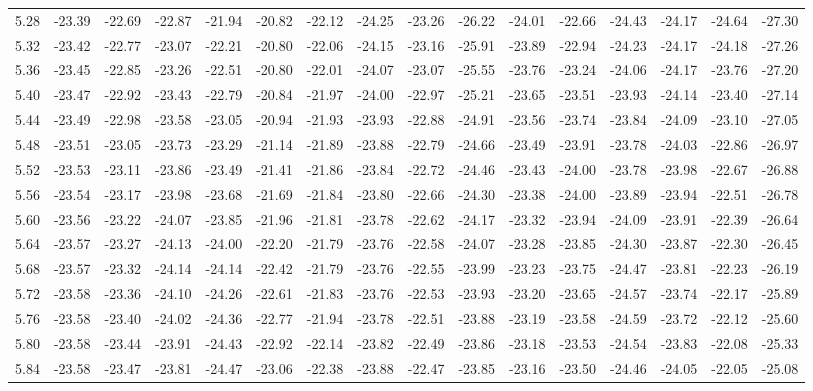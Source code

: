\documentclass[floatfix,traditabstract,preprint2]{aa}
\begin{document}
\begin{table}
\begin{tabular}{c  c c c c c c c c c c c c c c c}
5.28 & -23.39 & -22.69 & -22.87 & -21.94 & -20.82 & -22.12 & -24.25 & -23.26 & -26.22 & -24.01 & -22.66 & -24.43 & -24.17 & -24.64 & -27.30\\
5.32 & -23.42 & -22.77 & -23.07 & -22.21 & -20.80 & -22.06 & -24.15 & -23.16 & -25.91 & -23.89 & -22.94 & -24.23 & -24.17 & -24.18 & -27.26\\
5.36 & -23.45 & -22.85 & -23.26 & -22.51 & -20.80 & -22.01 & -24.07 & -23.07 & -25.55 & -23.76 & -23.24 & -24.06 & -24.17 & -23.76 & -27.20\\
5.40 & -23.47 & -22.92 & -23.43 & -22.79 & -20.84 & -21.97 & -24.00 & -22.97 & -25.21 & -23.65 & -23.51 & -23.93 & -24.14 & -23.40 & -27.14\\
5.44 & -23.49 & -22.98 & -23.58 & -23.05 & -20.94 & -21.93 & -23.93 & -22.88 & -24.91 & -23.56 & -23.74 & -23.84 & -24.09 & -23.10 & -27.05\\
5.48 & -23.51 & -23.05 & -23.73 & -23.29 & -21.14 & -21.89 & -23.88 & -22.79 & -24.66 & -23.49 & -23.91 & -23.78 & -24.03 & -22.86 & -26.97\\
5.52 & -23.53 & -23.11 & -23.86 & -23.49 & -21.41 & -21.86 & -23.84 & -22.72 & -24.46 & -23.43 & -24.00 & -23.78 & -23.98 & -22.67 & -26.88\\
5.56 & -23.54 & -23.17 & -23.98 & -23.68 & -21.69 & -21.84 & -23.80 & -22.66 & -24.30 & -23.38 & -24.00 & -23.89 & -23.94 & -22.51 & -26.78\\
5.60 & -23.56 & -23.22 & -24.07 & -23.85 & -21.96 & -21.81 & -23.78 & -22.62 & -24.17 & -23.32 & -23.94 & -24.09 & -23.91 & -22.39 & -26.64\\
5.64 & -23.57 & -23.27 & -24.13 & -24.00 & -22.20 & -21.79 & -23.76 & -22.58 & -24.07 & -23.28 & -23.85 & -24.30 & -23.87 & -22.30 & -26.45\\
5.68 & -23.57 & -23.32 & -24.14 & -24.14 & -22.42 & -21.79 & -23.76 & -22.55 & -23.99 & -23.23 & -23.75 & -24.47 & -23.81 & -22.23 & -26.19\\
5.72 & -23.58 & -23.36 & -24.10 & -24.26 & -22.61 & -21.83 & -23.76 & -22.53 & -23.93 & -23.20 & -23.65 & -24.57 & -23.74 & -22.17 & -25.89\\
5.76 & -23.58 & -23.40 & -24.02 & -24.36 & -22.77 & -21.94 & -23.78 & -22.51 & -23.88 & -23.19 & -23.58 & -24.59 & -23.72 & -22.12 & -25.60\\
5.80 & -23.58 & -23.44 & -23.91 & -24.43 & -22.92 & -22.14 & -23.82 & -22.49 & -23.86 & -23.18 & -23.53 & -24.54 & -23.83 & -22.08 & -25.33\\
5.84 & -23.58 & -23.47 & -23.81 & -24.47 & -23.06 & -22.38 & -23.88 & -22.47 & -23.85 & -23.16 & -23.50 & -24.46 & -24.05 & -22.05 & -25.08\\

\end{tabular}
\end{table}
\end{document}

